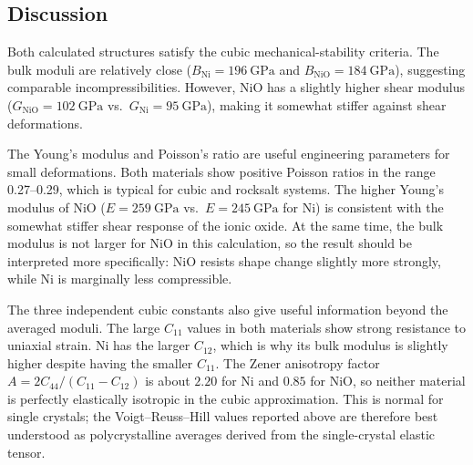 \begin{table}[h]
\centering
\caption{Elastic constant tensor for AFM-II DFT+\(U\) NiO (GPa).}
\label{tab:task-e-nio-tensor}
\end{table}

\subsection{Discussion}

Both calculated structures satisfy the cubic mechanical-stability criteria.  The
bulk moduli are relatively close (\(B_{\mathrm{Ni}} = 196~\mathrm{GPa}\) and
\(B_{\mathrm{NiO}} = 184~\mathrm{GPa}\)), suggesting comparable
incompressibilities.  However, NiO has a slightly higher shear modulus
(\(G_{\mathrm{NiO}} = 102~\mathrm{GPa}\) vs.\ \(G_{\mathrm{Ni}} = 95~\mathrm{GPa}\)),
making it somewhat stiffer against shear deformations.

The Young's modulus and Poisson's ratio are useful engineering parameters for
small deformations.  Both materials show positive Poisson ratios in the range
0.27--0.29, which is typical for cubic and rocksalt systems.  The higher Young's
modulus of NiO (\(E = 259~\mathrm{GPa}\) vs.\ \(E = 245~\mathrm{GPa}\) for Ni)
is consistent with the somewhat stiffer shear response of the ionic oxide.
At the same time, the bulk modulus is not larger for NiO in this calculation,
so the result should be interpreted more specifically: NiO resists shape change
slightly more strongly, while Ni is marginally less compressible.

The three independent cubic constants also give useful information beyond the
averaged moduli.  The large \(C_{11}\) values in both materials show strong
resistance to uniaxial strain.  Ni has the larger \(C_{12}\), which is why its
bulk modulus is slightly higher despite having the smaller \(C_{11}\).  The
Zener anisotropy factor \(A=2C_{44}/(C_{11}-C_{12})\) is about \(2.20\) for Ni
and \(0.85\) for NiO, so neither material is perfectly elastically isotropic in
the cubic approximation.  This is normal for single crystals; the
Voigt--Reuss--Hill values reported above are therefore best understood as
polycrystalline averages derived from the single-crystal elastic tensor.

